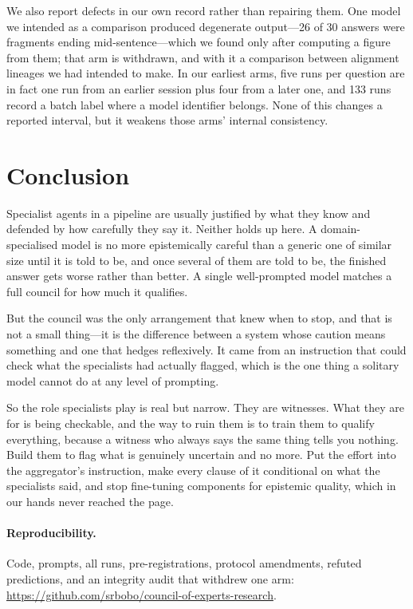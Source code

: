 \documentclass[11pt]{article}
\begin{document}
We also report defects in our own record rather than repairing them. One model
we intended as a comparison produced degenerate output---26 of 30 answers were
fragments ending mid-sentence---which we found only after computing a figure
from them; that arm is withdrawn, and with it a comparison between alignment
lineages we had intended to make. In our earliest arms, five runs per question
are in fact one run from an earlier session plus four from a later one, and
133 runs record a batch label where a model identifier belongs. None of this
changes a reported interval, but it weakens those arms' internal consistency.

\section{Conclusion}
Specialist agents in a pipeline are usually justified by what they know and
defended by how carefully they say it. Neither holds up here. A
domain-specialised model is no more epistemically careful than a generic one
of similar size until it is told to be, and once several of them are told to
be, the finished answer gets worse rather than better. A single well-prompted
model matches a full council for how much it qualifies.

But the council was the only arrangement that knew when to stop, and that is
not a small thing---it is the difference between a system whose caution means
something and one that hedges reflexively. It came from an instruction that
could check what the specialists had actually flagged, which is the one thing
a solitary model cannot do at any level of prompting.

So the role specialists play is real but narrow. They are witnesses. What they
are for is being checkable, and the way to ruin them is to train them to
qualify everything, because a witness who always says the same thing tells you
nothing. Build them to flag what is genuinely uncertain and no more. Put the
effort into the aggregator's instruction, make every clause of it conditional
on what the specialists said, and stop fine-tuning components for epistemic
quality, which in our hands never reached the page.

\paragraph{Reproducibility.} Code, prompts, all runs, pre-registrations,
protocol amendments, refuted predictions, and an integrity audit that withdrew
one arm: \url{https://github.com/srbobo/council-of-experts-research}.
\end{document}
